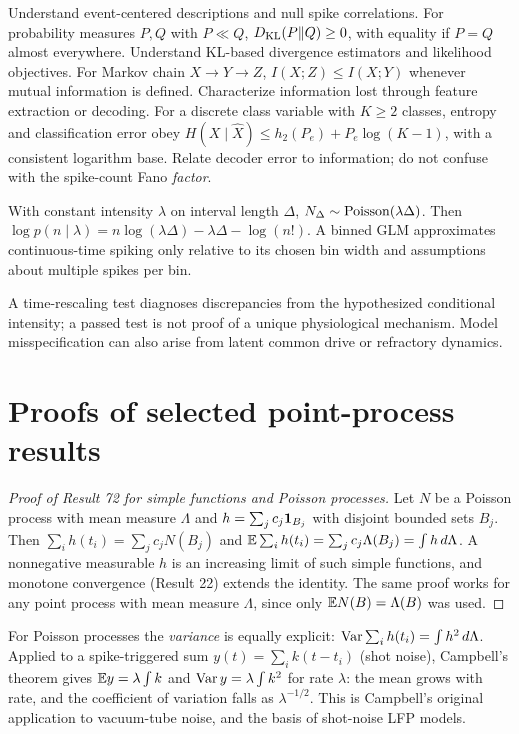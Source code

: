 {Understand event-centered descriptions and null spike correlations.}
{For probability measures $P,Q$ with $P\ll Q$,
$D_{\mathrm{KL}}(P\|Q)\geq0$, with equality if $P=Q$ almost everywhere.}
{Understand KL-based divergence estimators and likelihood objectives.}
{For Markov chain $X\to Y\to Z$,
$I(X;Z)\leq I(X;Y)$ whenever mutual information is defined.}
{Characterize information lost through feature extraction or decoding.}
{For a discrete class variable with $K\geq2$ classes,
entropy and classification error obey
$H(X\mid\widehat X)\leq h_2(P_e)+P_e\log(K-1)$,
with a consistent logarithm base.}
{Relate decoder error to information; do not confuse with the
spike-count Fano \emph{factor}.}

\begin{example}
With constant intensity $\lambda$ on interval length $\Delta$,
$N_\Delta\sim\operatorname{Poisson}(\lambda\Delta)$.
Then
$\log p(n\mid\lambda)=n\log(\lambda\Delta)
-\lambda\Delta-\log(n!)$.
A binned GLM approximates continuous-time spiking only relative
to its chosen bin width and assumptions about multiple spikes per bin.
\end{example}
\begin{caution}
A time-rescaling test diagnoses discrepancies from the hypothesized
conditional intensity; a passed test is not proof of a unique
physiological mechanism. Model misspecification can also arise from
latent common drive or refractory dynamics.
\end{caution}
\section{Proofs of selected point-process results}
\begin{proof}[Proof of Result 72 for simple functions and Poisson processes]
Let $N$ be a Poisson process with mean measure $\Lambda$ and
$h=\sum_jc_j\mathbf{1}_{B_j}$ with disjoint bounded sets $B_j$. Then
$\sum_ih(t_i)=\sum_jc_jN(B_j)$ and
$\mathbb{E}\sum_ih(t_i)=\sum_jc_j\Lambda(B_j)=\int h\,d\Lambda$. A nonnegative
measurable $h$ is an increasing limit of such simple functions, and
monotone convergence (Result 22) extends the identity. The same proof
works for any point process with mean measure $\Lambda$, since only
$\mathbb{E} N(B)=\Lambda(B)$ was used.
\end{proof}
For Poisson processes the \emph{variance} is equally explicit:
$\operatorname{Var}\sum_ih(t_i)=\int h^2\,d\Lambda$. Applied to a spike-triggered
sum $y(t)=\sum_ik(t-t_i)$ (shot noise), Campbell's theorem gives
$\mathbb{E} y=\lambda\int k$ and $\operatorname{Var} y=\lambda\int k^2$ for rate $\lambda$:
the mean grows with rate, and the coefficient of variation falls as
$\lambda^{-1/2}$. This is Campbell's original application to
vacuum-tube noise, and the basis of shot-noise LFP models.


